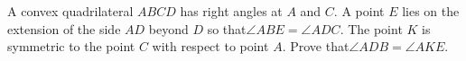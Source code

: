 A convex quadrilateral $ABCD$ has right angles at $A$ and $C$. A point $E$ lies on the extension of the side $AD$ beyond $D$ so that$\angle ABE =\angle ADC$. The point $K$ is symmetric to the point $C$ with respect to point $A$. Prove that$\angle ADB =\angle AKE$.